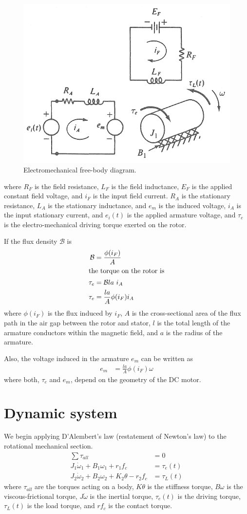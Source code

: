 \documentclass[]{article}
\begin{document}
\begin{figure}[H]
	\centering
	\includegraphics[width=0.5\linewidth]{Electromechanical_free-body}
	\caption{Electromechanical free-body diagram.}
	\label{fig:electromechanical_free-body}
\end{figure}
where $R_F$ is the field resistance, $L_F$ is the field inductance, $E_F$ is the applied constant field voltage, and $i_F$ is the input field current. $R_A$ is the stationary resistance, $L_A$ is the stationary inductance, and $e_m$ is the induced voltage, $i_A$ is the input stationary current, and $e_i(t)$ is the applied armature voltage, and $\tau_e$ is the electro-mechanical driving torque exerted on the rotor. 

If the flux density $\mathcal{B}$ is
\begin{align}
	\mathcal{B} & = \frac{\phi(i_F)}{A}           \\
	\intertext{the torque on the rotor is}
	\tau_e      & = \mathcal{B} l a~i_A \nonumber \\
	\tau_e      & = \frac{l a}{A} \phi(i_F) i_A \label{eq:tau_e}
\end{align}
where $\phi(i_F)$ is the flux induced by $i_F$, $A$ is the cross-sectional area of the flux path in the air gap between the rotor and stator, $l$ is the total length of the armature conductors within the magnetic field, and $a$ is the radius of the armature.

Also, the voltage induced in the armature $e_m$ can be written as
\begin{align}
	e_m & = \frac{l a}{A} \phi(i_F) \omega
\end{align}
where both, $\tau_e$ and $e_m$, depend on the geometry of the DC motor. 


\section{Dynamic system}
We begin applying D'Alembert's law (restatement of Newton's law) to the rotational mechanical section.
\begin{align}
	\sum \tau_{all}                                          & = 0 \nonumber                 \\
	J_1 \dot{\omega}_1 + B_1 \omega_1 + r_1 f_c              & = \tau_e(t)   \label{eq:Rot1} \\
	J_2 \dot{\omega}_2 + B_2 \omega_2 + K_2 \theta - r_2 f_c & = \tau_L(t)	 \label{eq:Rot2}
\end{align}
where $\tau_{all}$ are the torques acting on a body, $K\theta$ is the stiffness torque, $B\omega$ is the viscous-frictional torque, $J\dot{\omega}$ is the inertial torque, $\tau_e(t)$ is the driving torque,  $\tau_L(t)$ is the load torque, and $r f_c$ is the contact torque.
\end{document}
